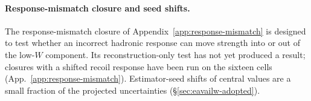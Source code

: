 \paragraph{Response-mismatch closure and seed shifts.} The response-mismatch closure of Appendix~\ref{app:response-mismatch} is designed to test whether an incorrect hadronic response can move strength into or out of the low-$W$ component. Its reconstruction-only test has not yet produced a result; closures with a shifted recoil response have been run on the sixteen cells (App.~\ref{app:response-mismatch}). Estimator-seed shifts of central values are a small fraction of the projected uncertainties (\S\ref{sec:eavailw-adopted}).

